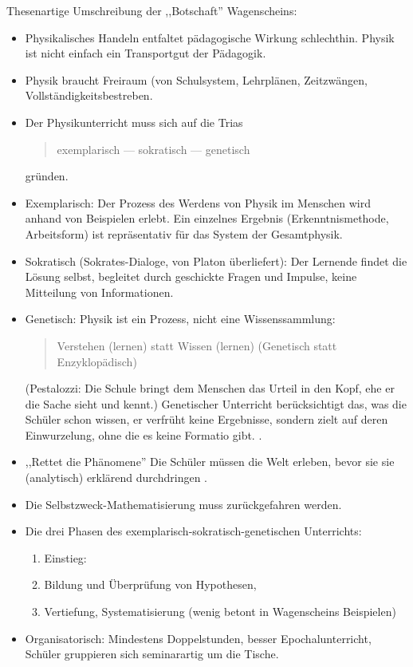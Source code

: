 \bip
Thesenartige Umschreibung der ,,Botschaft'' Wagenscheins:
\begin{itemize}

\item Physikalisches Handeln entfaltet p\"{a}dagogische  Wirkung
schlechthin. Physik ist nicht einfach ein Transportgut der P\"{a}dagogik.

\item Physik braucht Freiraum (von Schulsystem, Lehrpl\"{a}nen,
Zeitzw\"{a}ngen, Vollst\"{a}ndigkeitsbestreben.
\item Der Physikunterricht muss sich auf die Trias
\begin{quote}
exemplarisch --- sokratisch --- genetisch
\end{quote}
gr\"{u}nden.


\item Exemplarisch: Der Prozess des Werdens von Physik im Menschen
wird anhand von Beispielen erlebt.
Ein einzelnes Ergebnis (Erkenntnismethode,
Arbeitsform) ist repr\"{a}sentativ f\"{u}r das System der Gesamtphysik.
\item Sokratisch  (Sokrates-Dialoge, von Platon \"{u}berliefert):
Der Lernende findet die L\"{o}sung selbst, begleitet durch geschickte
Fragen und Impulse, keine Mitteilung von Informationen.


\item Genetisch: Physik ist ein Prozess, nicht eine Wissenssammlung:
\begin{quote}
Verstehen (lernen) statt Wissen (lernen)  (Genetisch statt
Enzyklop\"{a}disch)
\end{quote}
(Pestalozzi: Die Schule bringt dem Menschen das Urteil in den Kopf,
ehe er die Sache sieht und kennt.)
\mip
Genetischer Unterricht ber\"{u}cksichtigt das, was die
Sch\"{u}ler schon wissen, er verfr\"{u}ht keine Ergebnisse, sondern zielt
auf deren Einwurzelung, ohne die es keine Formatio gibt.
 \autocite[S.\ 107 oben]{DuitHausslerKircher}.

\item ,,Rettet die Ph\"{a}nomene'' Die Sch\"{u}ler m\"{u}ssen die Welt
erleben, bevor sie sie (analytisch) erkl\"{a}rend durchdringen
\autocite[S.\ 90,104]{WagenscheinNSV}.

\item Die Selbstzweck-Mathematisierung muss zur\"{u}ckgefahren werden.

\item Die drei Phasen des exemplarisch-sokratisch-genetischen Unterrichts:
\begin{enumerate}
\item Einstieg: 
\autocite[S.\ 205]{WagenscheinPDP}
\item Bildung und \"{U}berpr\"{u}fung von Hypothesen,
\item Vertiefung, Systematisierung (wenig betont in Wagenscheins
Beispielen)
\end{enumerate}

\item Organisatorisch: Mindestens Doppelstunden, besser
Epochalunterricht, Sch\"{u}ler gruppieren sich seminarartig um die
Tische.
\end{itemize}

